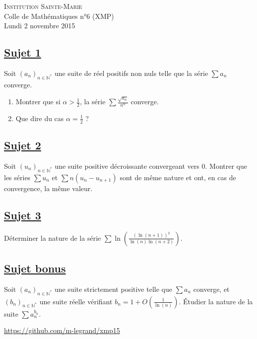\documentclass[12pt,a4paper]{report}
\begin{document}
\newcommand{\rA}{\mathcal{A}}
\newcommand{\rB}{\mathcal{B}}
\newcommand{\rC}{\mathcal{C}}
\newcommand{\rG}{\mathcal{G}}
\newcommand{\rF}{\mathcal{F}}
\newcommand{\rO}{\mathcal{O}}
\newcommand{\rP}{\mathcal{P}}
\newcommand{\rH}{\mathcal{H}}
\newcommand{\rR}{\mathcal{R}}
\newcommand{\rE}{\mathcal{E}}
\newcommand{\rL}{\mathcal{L}}
\newcommand{\rM}{\mathcal{M}}
\newcommand{\bK}{\mathbb{K}}
\newcommand{\bQ}{\mathbb{Q}}
\newcommand{\bR}{\mathbb{R}}
\newcommand{\bZ}{\mathbb{Z}}
\newcommand{\bN}{\mathbb{N}}
\newcommand{\bC}{\mathbb{C}}
\newcommand{\bP}{\mathbb{P}}
\newcommand{\bF}{\mathbb{F}}

\ifpdf
{}
\else
{}
\fi

\pagestyle{empty} %

\noindent \textsc{Institution Sainte-Marie}\\
Colle de Mathématiques n°6 (XMP)\\
Lundi 2 novembre 2015


\subsection*{\underline{Sujet 1}}
Soit $(a_n)_{n\in\bN^*}$ une suite de réel positifs non nuls telle que la série $\sum a_n$ converge.
\begin{enumerate}
\item Montrer que si $\alpha>\frac{1}{2}$, la série $\sum\frac{\sqrt{a_n}}{n^\alpha}$ converge.
\item Que dire du cas $\alpha=\frac{1}{2}$ ?
\end{enumerate}

\subsection*{\underline{Sujet 2}}
Soit $(u_n)_{n\in\bN^*}$ une suite positive décroissante convergeant vers $0$. Montrer que les séries $\sum u_n$ et $\sum n(u_n-u_{n+1})$ sont de même nature et ont, en cas de convergence, la même valeur.

\subsection*{\underline{Sujet 3}}
Déterminer la nature de la série $\sum \ln\left(\frac{(\ln(n+1))^2}{\ln(n)\ln(n+2)}\right)$.

\subsection*{\underline{Sujet bonus}}
Soit $(a_n)_{n\in\bN^*}$ une suite strictement positive telle que $\sum a_n$ converge, et $(b_n)_{n\in\bN^*}$ une suite réelle vérifiant $b_n = 1+O\left(\frac{1}{\ln(n)}\right)$. Étudier la nature de la suite $\sum a_n^{b_n}$.

\vfill

\begin{center}
\url{https://github.com/m-legrand/xmp15}
\end{center}
\end{document}
